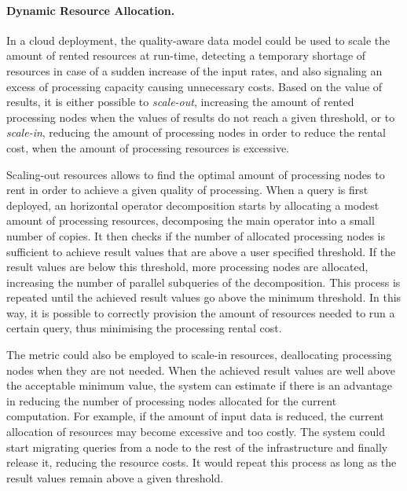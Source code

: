 \paragraph{Dynamic Resource Allocation.}
In a cloud deployment, the quality-aware data model could be used to scale the amount of
rented resources at run-time, detecting a temporary shortage of resources in case of a sudden increase of
the input rates, and also signaling an excess of processing capacity causing unnecessary costs.
Based on the \sic value of results, it is either possible to \emph{scale-out}, increasing the amount of
rented processing nodes when the \sic values of results do not reach a given threshold, or to
\emph{scale-in}, reducing the amount of processing nodes in order to reduce the rental cost, when the
amount of processing resources is excessive.

Scaling-out resources allows to find the optimal amount of processing nodes to rent in order to achieve a
given quality of processing. When a query is first deployed, an horizontal operator decomposition starts
by allocating a modest amount of processing resources, decomposing the main operator into a small number
of copies. It then checks if the number of allocated processing nodes is sufficient to achieve result
\sic values that are above a user specified threshold. If the result \sic values are below this
threshold, more processing nodes are allocated, increasing the number of parallel subqueries of the decomposition.
This process is repeated until the achieved result \sic values go above the minimum threshold. In this
way, it is possible to correctly provision the amount of resources needed to run a certain query,
thus minimising the processing rental cost.

The \sic metric could also be employed to scale-in resources, deallocating processing nodes when they
are not needed. When the achieved result \sic values are well above the acceptable minimum
value, the system can estimate if there is an advantage in reducing the number of processing nodes
allocated for the current computation. For example, if the amount of input data is reduced, the current allocation of
resources may become excessive and too costly.
The system could start migrating queries from a node to the rest of the infrastructure and
finally release it, reducing the resource costs. It would repeat this process as long as the result \sic
values remain above a given threshold.

